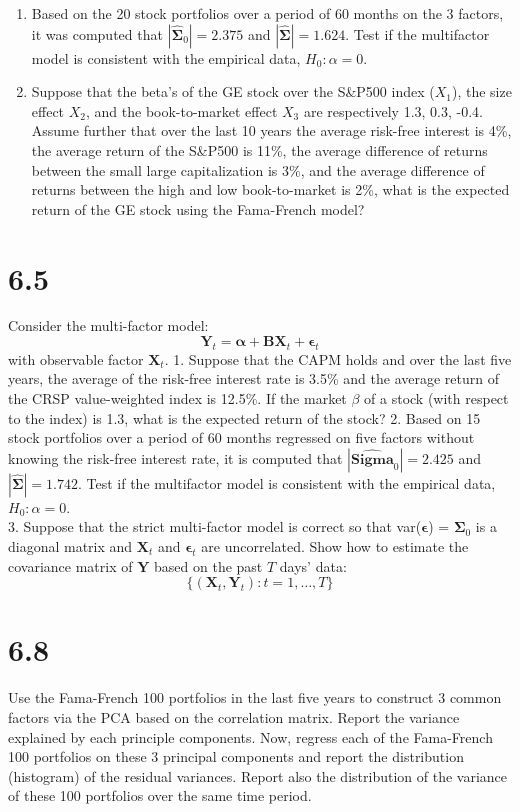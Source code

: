 \documentclass[11pt,]{article}
\newcommand{\V}[1]{{\bm{{#1}}}}
\providecommand{\tightlist}{%
\setlength{\itemsep}{0pt}\setlength{\parskip}{0pt}}
\begin{document}
\begin{enumerate}
\def\labelenumi{\arabic{enumi}.}
\tightlist
\item
  Based on the 20 stock portfolios over a period of 60 months on the 3
  factors, it was computed that \(|\V{\hat{\Sigma}}_0| = 2.375\) and
  \(|\V{\hat{\Sigma}}| = 1.624\). Test if the multifactor model is
  consistent with the empirical data, \(H_0: \alpha = 0\).
\item
  Suppose that the beta's of the GE stock over the S\&P500 index
  (\(X_1\)), the size effect \(X_2\), and the book-to-market effect
  \(X_3\) are respectively 1.3, 0.3, -0.4. Assume further that over the
  last 10 years the average risk-free interest is 4\%, the average
  return of the S\&P500 is 11\%, the average difference of returns
  between the small large capitalization is 3\%, and the average
  difference of returns between the high and low book-to-market is 2\%,
  what is the expected return of the GE stock using the Fama-French
  model?
\end{enumerate}

\section{6.5}\label{section-2}

Consider the multi-factor model: \[
\V{Y}_t = \V{\alpha} + \V{B}\V{X}_t + \V{\epsilon}_t
\] with observable factor \(\V{X}_t\). 1. Suppose that the CAPM holds
and over the last five years, the average of the risk-free interest rate
is 3.5\% and the average return of the CRSP value-weighted index is
12.5\%. If the market \(\beta\) of a stock (with respect to the index)
is 1.3, what is the expected return of the stock? 2. Based on 15 stock
portfolios over a period of 60 months regressed on five factors without
knowing the risk-free interest rate, it is computed that
\(|\V{\hat{Sigma}}_0| = 2.425\) and \(|\V{\hat{\Sigma}}| = 1.742\). Test
if the multifactor model is consistent with the empirical data,
\(H_0: \alpha = 0\).\\
3. Suppose that the strict multi-factor model is correct so that
var(\(\V{\epsilon}\)) = \(\V{\Sigma}_0\) is a diagonal matrix and
\(\V{X}_t\) and \(\V{\epsilon}_t\) are uncorrelated. Show how to
estimate the covariance matrix of \(\V{Y}\) based on the past \(T\)
days' data: \[
\{(\V{X}_t, \V{Y}_t): t = 1, \ldots, T\}
\]

\section{6.8}\label{section-3}

Use the Fama-French 100 portfolios in the last five years to construct 3
common factors via the PCA based on the correlation matrix. Report the
variance explained by each principle components. Now, regress each of
the Fama-French 100 portfolios on these 3 principal components and
report the distribution (histogram) of the residual variances. Report
also the distribution of the variance of these 100 portfolios over the
same time period.
\newpage
\singlespacing 
\end{document}
